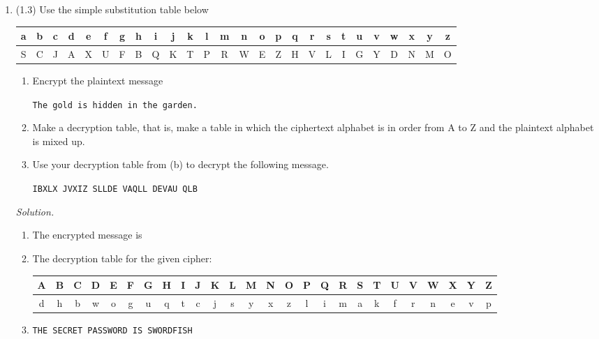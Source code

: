 \documentclass[12pt]{amsart}
\theoremstyle{definition}
\begin{document}
\begin{enumerate}
  \item (1.3) Use the simple substitution table below
  \begin{center}
	  \begin{tabular}{|c |c |c |c |c |c |c |c |c |c |c |c |c |c |c |c |c |c |c |c |c |c |c |c| c| c|}
		  \hline
		  a & b & c & d & e & f & g & h & i & j & k & l & m & n & o & 
		  p & q & r & s & t & u & v & w & x & y & z \\
		  \hline
		  S & C & J & A & X & U & F & B & Q & K & T & P & R & W & E & 
		  Z & H & V & L & I & G & Y & D & N & M & O \\
		  \hline
	  \end{tabular}
  \end{center}
  \begin{enumerate}
	  \item Encrypt the plaintext message
	  \begin{center}
		  \texttt{The gold is hidden in the garden.}
	  \end{center}
	  \item Make a decryption table, that is, make a table in which the ciphertext 
		  alphabet is in order from A to Z and the plaintext alphabet is mixed up.
	  \item Use your decryption table from (b) to decrypt the following message.
	  \begin{center}
		  \texttt{IBXLX JVXIZ SLLDE VAQLL DEVAU QLB}
	  \end{center}
  \end{enumerate}
  
  \medskip
  \textit{Solution.}

 	 \begin{enumerate}
		\item The encrypted message is
		\begin{center}
			\texttt{}
		\end{center}
	 	\item The decryption table for the given cipher:
                \begin{center}
                \hspace*{-1cm}
    			\begin{tabular}{|c |c |c |c |c |c |c |c |c |c |c |c |c |c |c |c |c |c |c |c |c |c |c |c| c| c|}
    				\hline
    				A & B & C & D & E & F & G & H & I & J & K & L & M & N & O & 
    				P & Q & R & S & T & U & V & W & X & Y & Z \\
    				\hline
    				d & h & b & w & o & g & u & q & t & c & j & s & y & x & z & 
    				l & i & m & a & k & f & r & n & e & v & p \\
    				\hline 
    			\end{tabular} 
	        \end{center} 
            \medskip
            \item \texttt{THE SECRET PASSWORD IS SWORDFISH} 
	 	\end{enumerate}


\end{enumerate}
\end{document}
